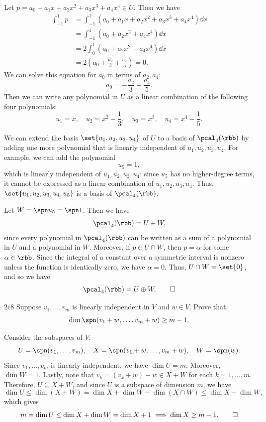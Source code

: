 \begin{solenum}
    \item Let $p = a_0 + a_1 x + a_2 x^2 + a_3 x^3 + a_4 x^4 \in U$.
	Then we have
    \begin{align*}
        \int_{-1}^1 p & = \int_{-1}^1 (a_0 + a_1 x + a_2 x^2 + a_3 x^3 + a_4 x^4) \dd x \\
        & = \int_{-1}^1 (a_0 + a_2 x^2 + a_4 x^4) \dd x \\
        & = 2\int_0^1 (a_0 + a_2 x^2 + a_4 x^4) \dd x \\
        & = 2\left(a_0 + \frac{a_2}{3} + \frac{a_4}{5}\right) = 0.
    \end{align*}
    We can solve this equation for $a_0$ in terms of $a_2, a_4$:
    \[
    	a_0 = - \frac{a_2}{3} - \frac{a_4}{5}.
    \]
    Then we can write any polynomial in $U$ as a linear combination of the following four polynomials:
    \[
    	u_1 = x, \quad u_2 = x^2 - \frac 13, \quad u_3 = x^3, \quad u_4 = x^4 - \frac 15.
    \]
    \item We can extend the basis $\set{u_1, u_2, u_3, u_4}$ of $U$ to a basis of $\pcal_4(\rbb)$ by adding one more polynomial that is linearly independent of $u_1, u_2, u_3, u_4$.
	For example, we can add the polynomial
    \[
    	u_5 = 1,
    \]
    which is linearly independent of $u_1, u_2, u_3, u_4$: since $u_5$ has no higher-degree terms, it cannot be expressed as a linear combination of $u_1, u_2, u_3, u_4$.
	Thus, $\set{u_1, u_2, u_3, u_4, u_5}$ is a basis of $\pcal_4(\rbb)$.
    \item Let $W = \spn u_5 = \spn 1$.
	Then we have
    \[
    	\pcal_4(\rbb) = U + W,
    \]
    since every polynomial in $\pcal_4(\rbb)$ can be written as a sum of a polynomial in $U$ and a polynomial in $W$.
	Moreover, if $p \in U \cap W$, then $p = \alpha$ for some $\alpha \in \rbb$.
	Since the integral of a constant over a symmetric interval is nonzero unless the function is identically zero, we have $\alpha = 0$.
	Thus, $U \cap W = \set{0}$, and so we have
    \[
    	\pcal_4(\rbb) = U \oplus W. \qedhere
    \]
\end{solenum}

\begin{exercise}{2c8}
    Suppose $v_1, \ldots, v_m$ is linearly independent in $V$ and $w \in V$.
	Prove that
    \[
    	\dim \spn(v_1 + w, \ldots, v_m + w) \geq m - 1.
    \]
\end{exercise}

\begin{sol}
    Consider the subspaces of $V$:
    \[
        U = \spn(v_1, \ldots, v_m), \quad X = \spn(v_1 + w, \ldots, v_m + w), \quad W = \spn(w).
    \]
    Since $v_1, \ldots, v_m$ is linearly independent, we have $\dim U = m$.
    Moreover, $\dim W = 1$.
    Lastly, note that $v_k = (v_k + w) - w \in X + W$ for each $k = 1, \ldots, m$.
    Therefore, $U \subseteq X + W$, and since $U$ is a subspace of dimension $m$, we have
    \[
        \dim U \leq \dim(X + W) = \dim X + \dim W - \dim(X \cap W) \leq \dim X + \dim W,
    \]
    which gives
    \[
        m = \dim U \leq \dim X + \dim W = \dim X + 1 \implies \dim X \geq m - 1. \qedhere
    \]
\end{sol}

